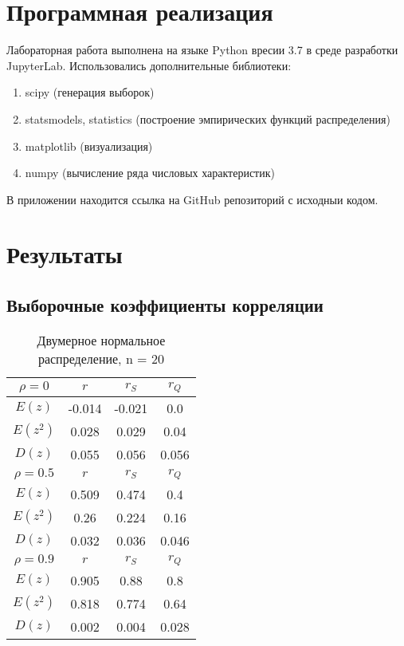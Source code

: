 \documentclass{article}
\begin{document}
\section{Программная реализация}
\noindent Лабораторная работа выполнена на языке Python вресии 3.7 в среде разработки JupyterLab. Использовались дополнительные библиотеки:
 \begin{enumerate}
        \item scipy (генерация выборок)
        \item statsmodels, statistics (построение эмпирических функций распределения)
        \item matplotlib (визуализация)
        \item numpy (вычисление ряда числовых характеристик)
    \end{enumerate}
В приложении находится ссылка на GitHub репозиторий с исходныи кодом.

\section{Результаты}
\subsection{Выборочные коэффициенты корреляции}
	\begin{table}[H]
		\centering
		\begin{tabular}{| c | c | c | c |}
			
			\hline
			$\rho=0$  & $r$      & $r_S$  & $r_Q$ \\
			\hline
            $E(z)$    & -0.014 & -0.021 & 0.0   \\
            $E(z^{2})$  & 0.028  & 0.029  & 0.04  \\
            $D(z)$    & 0.055  & 0.056  & 0.056 \\
			\hline
			$\rho=0.5$ & $r$      & $r_S$  & $r_Q$ \\
			\hline
			$E(z)$      & 0.509 & 0.474 & 0.4   \\
            $E(z^{2})$   & 0.26  & 0.224 & 0.16  \\
            $D(z)$     & 0.032 & 0.036 & 0.046 \\
			\hline
			$\rho=0.9$  & $r$      & $r_S$  & $r_Q$ \\
			\hline
			$E(z)$      & 0.905 & 0.88  & 0.8   \\
            $E(z^{2})$    & 0.818 & 0.774 & 0.64  \\
            $D(z)$      & 0.002 & 0.004 & 0.028 \\
			\hline
			
		\end{tabular}{}
		\caption{Двумерное нормальное распределение, n = 20}
		\label{tab:n20}
	\end{table}
	
\end{document}
